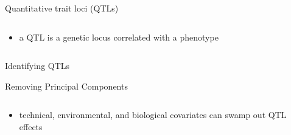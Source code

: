 \documentclass{beamer}
\begin{document}
\begin{frame}{Quantitative trait loci (QTLs)}
    \begin{columns}
        \begin{column}{0.4\textwidth}
            \begin{itemize}
                \item a QTL is a genetic locus correlated with a phenotype
            \end{itemize}
        \end{column}
        \begin{column}{0.65\textwidth}
            
        \end{column}
    \end{columns}
\end{frame}

\begin{frame}{Identifying QTLs}
    \begin{center}
        \tikzexternaldisable
        
        \tikzexternalenable
    \end{center}
\end{frame}

\begin{frame}{Removing Principal Components}
    \begin{columns}
    \begin{column}{0.4\textwidth}
        \begin{itemize}
            \item technical, environmental, and biological covariates can swamp
                out QTL effects
        \end{itemize}
    \end{column}
    \begin{column}{0.6\textwidth}
        
    \end{column}
    \end{columns}
\end{frame}
\end{document}
